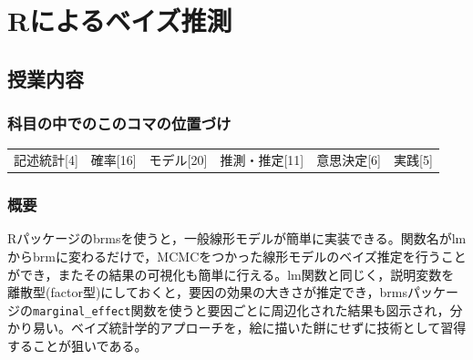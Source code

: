 \section{Rによるベイズ推測}
\label{D1_lesson29}

\subsection{授業内容}
\subsubsection{科目の中でのこのコマの位置づけ}
\begin{tabular}[t]{cccccc}
    記述統計[4] & 確率[16] & モデル[20] & 推測・推定[11] & 意思決定[6] & 実践[5]
\end{tabular}
\subsubsection{概要}
Rパッケージのbrmsを使うと，一般線形モデルが簡単に実装できる。関数名がlmからbrmに変わるだけで，MCMCをつかった線形モデルのベイズ推定を行うことができ，またその結果の可視化も簡単に行える。lm関数と同じく，説明変数を離散型(factor型)にしておくと，要因の効果の大きさが推定でき，brmsパッケージの\verb|marginal_effect|関数を使うと要因ごとに周辺化された結果も図示され，分かり易い。ベイズ統計学的アプローチを，絵に描いた餅にせずに技術として習得することが狙いである。
